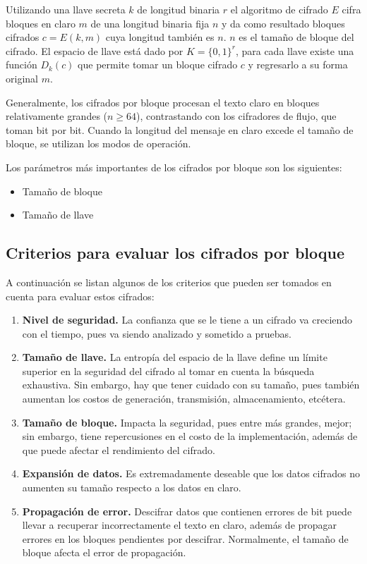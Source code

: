 Utilizando una llave secreta $k$ de longitud binaria $r$ el algoritmo de
cifrado $E$ cifra bloques en claro $m$ de una longitud binaria fija $n$ y
da como resultado bloques cifrados $c = E (k,m)$ cuya longitud también es
$n$. $n$ es el tamaño de bloque del cifrado.
El espacio de llave está dado por $K = \{0,1\}^r$, para cada llave existe una
función $D_k(c)$ que permite tomar un bloque cifrado $c$ y regresarlo a su
forma original $m$.

Generalmente, los cifrados por bloque procesan el texto claro en bloques
relativamente grandes ($n \geq 64$), contrastando con los cifradores de
flujo, que toman bit por bit. Cuando la longitud del mensaje en claro excede
el tamaño de bloque, se utilizan los modos de operación.

Los parámetros más importantes de los cifrados por bloque son los
siguientes:
\begin{itemize}
  \item Tamaño de bloque
  \item Tamaño de llave
\end{itemize}

\subsection{Criterios para evaluar los cifrados por bloque}

A continuación se listan algunos de los criterios que pueden ser tomados
en cuenta para evaluar estos cifrados:
\begin{enumerate}
  \item \textbf{Nivel de seguridad.} La confianza que se le tiene a un
    cifrado va creciendo con el tiempo, pues va siendo analizado y
    sometido a pruebas.
  \item \textbf{Tamaño de llave.} La entropía del espacio de la llave
    define un límite superior en la seguridad del cifrado al tomar en
    cuenta la búsqueda exhaustiva. Sin embargo, hay que tener cuidado
    con su tamaño, pues también aumentan los costos de generación,
    transmisión, almacenamiento, etcétera.
  \item \textbf{Tamaño de bloque.} Impacta la seguridad, pues entre más
    grandes, mejor; sin embargo, tiene repercusiones en el costo de la
    implementación, además de que puede afectar el rendimiento del
    cifrado.
  \item \textbf{Expansión de datos.} Es extremadamente deseable que los
    datos cifrados no aumenten su tamaño respecto a los datos en claro.
  \item \textbf{Propagación de error.} Descifrar datos que contienen
    errores de bit puede llevar a recuperar incorrectamente el texto en
    claro, además de propagar errores en los bloques pendientes por
    descifrar. Normalmente, el tamaño de bloque afecta el error de
    propagación.
\end{enumerate}

